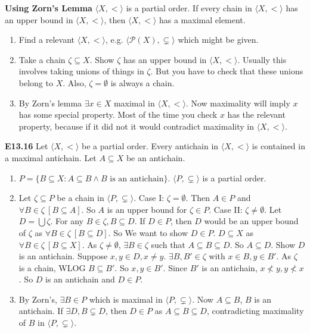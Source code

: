 \documentclass[10pt, landscape]{article}
\begin{document}
\begin{multicols*}{3}
\textbf{Using Zorn's Lemma} $\langle X, < \rangle$ is a partial order. If every chain in $\langle X, < \rangle$ has an upper bound in $\langle X, < \rangle$, then $\langle X, < \rangle$ has a maximal element.
\begin{enumerate}
    \item Find a relevant $\langle X, < \rangle$, e.g. $\langle \mathcal{P}(X), \subsetneq \rangle$ which might be given.
    \item Take a chain $\zeta \subseteq X$. Show $\zeta$ has an upper bound in $\langle X, < \rangle$. Usually this involves taking unions of things in $\zeta$. But you have to check that these unions belong to $X$. Also, $\zeta=\emptyset$ is always a chain.
    \item By Zorn's lemma $\exists x \in X$ maximal in $\langle X, < \rangle$. Now maximality will imply $x$ has some special property. Most of the time you check $x$ has the relevant property, because if it did not it would contradict maximality in $\langle X, < \rangle$.
\end{enumerate}

\textbf{E13.16} Let $\langle X, < \rangle$ be a partial order. Every antichain in $\langle X, < \rangle$ is contained in a maximal antichain. Let $A \subseteq X$ be an antichain.
\begin{enumerate}
    \item $P=\{B\subseteq X:A\subseteq B\land B\text{ is an antichain}\}$. $\langle P, \subsetneq\rangle$ is a partial order.
    \item Let $\zeta \subseteq P$ be a chain in $\langle P, \subsetneq\rangle$. Case I: $\zeta=\emptyset$. Then $A\in P$ and $\forall B \in \zeta \ [B \subseteq A]$. So $A$ is an upper bound for $\zeta \in P$. Case II: $\zeta\neq\emptyset$. Let $D=\bigcup \zeta$. For any $B \in \zeta, B\subseteq D$. If $D \in P$, then $D$ would be an upper bound of $\zeta$ as $\forall B \in \zeta \ [B\subseteq D]$. So We want to show $D \in P$. $D\subseteq X$ as $\forall B \in \zeta \ [B \subseteq X]$. As $\zeta \neq \emptyset$, $\exists B \in \zeta$ such that $A\subseteq B \subseteq D$. So $A \subseteq D$. Show $D$ is an antichain. Suppose $x, y \in D, x\neq y$. $\exists B, B' \in \zeta$ with $x\in B, y \in B'$. As $\zeta$ is a chain, WLOG $B \subseteq B'$. So $x, y \in B'$. Since $B'$ is an antichain, $x \not< y, y \not< x$. So $D$ is an antichain and $D \in P$.
    \item By Zorn's, $\exists B \in P$ which is maximal in $\langle P, \subsetneq \rangle$. Now $A \subseteq B$, $B$ is an antichain. If $\exists D, B \subsetneq D$, then $D \in P$ as $A \subseteq B \subseteq D$, contradicting maximality of $B$ in $\langle P, \subsetneq \rangle$.
\end{enumerate}


\end{multicols*}
\end{document}
